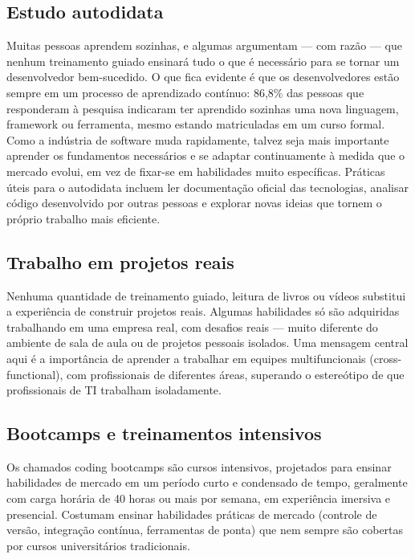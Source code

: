 \subsection{Estudo autodidata}

Muitas pessoas aprendem sozinhas, e algumas argumentam — com razão — que nenhum treinamento guiado ensinará tudo o que é necessário para se tornar um desenvolvedor bem-sucedido. O que fica evidente é que os desenvolvedores estão sempre em um processo de aprendizado contínuo: 86,8\% das pessoas que responderam à pesquisa indicaram ter aprendido sozinhas uma nova linguagem, framework ou ferramenta, mesmo estando matriculadas em um curso formal. Como a indústria de software muda rapidamente, talvez seja mais importante aprender os fundamentos necessários e se adaptar continuamente à medida que o mercado evolui, em vez de fixar-se em habilidades muito específicas. Práticas úteis para o autodidata incluem ler documentação oficial das tecnologias, analisar código desenvolvido por outras pessoas e explorar novas ideias que tornem o próprio trabalho mais eficiente.

\subsection{Trabalho em projetos reais}

Nenhuma quantidade de treinamento guiado, leitura de livros ou vídeos substitui a experiência de construir projetos reais. Algumas habilidades só são adquiridas trabalhando em uma empresa real, com desafios reais — muito diferente do ambiente de sala de aula ou de projetos pessoais isolados. Uma mensagem central aqui é a importância de aprender a trabalhar em equipes multifuncionais (cross-functional), com profissionais de diferentes áreas, superando o estereótipo de que profissionais de TI trabalham isoladamente.

\subsection{Bootcamps e treinamentos intensivos}

Os chamados coding bootcamps são cursos intensivos, projetados para ensinar habilidades de mercado em um período curto e condensado de tempo, geralmente com carga horária de 40 horas ou mais por semana, em experiência imersiva e presencial. Costumam ensinar habilidades práticas de mercado (controle de versão, integração contínua, ferramentas de ponta) que nem sempre são cobertas por cursos universitários tradicionais.

